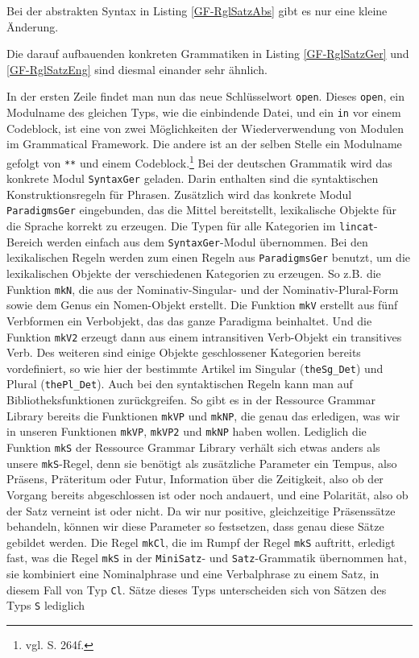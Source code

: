 
Bei der abstrakten Syntax in Listing \ref{GF-RglSatzAbs} gibt es nur eine kleine Änderung.

Die darauf aufbauenden konkreten Grammatiken in Listing \ref{GF-RglSatzGer} und \ref{GF-RglSatzEng} sind diesmal einander sehr ähnlich. \par
In der ersten Zeile findet man nun das neue Schlüsselwort \texttt{open}. Dieses \texttt{open}, ein Modulname des gleichen Typs, wie die einbindende Datei, und ein \texttt{in} vor einem Codeblock, ist eine von zwei Möglichkeiten der Wiederverwendung von Modulen im Grammatical Framework. Die andere ist an der selben Stelle ein Modulname gefolgt von \texttt{**} und einem Codeblock.\footnote{vgl. \cite{RANTA2011} S. 264f.} Bei der deutschen Grammatik wird das konkrete Modul \texttt{SyntaxGer} geladen. Darin enthalten sind die syntaktischen Konstruktionsregeln für Phrasen. Zusätzlich wird das konkrete Modul \texttt{ParadigmsGer} eingebunden, das die Mittel bereitstellt, lexikalische Objekte für die Sprache korrekt zu erzeugen. Die Typen für alle Kategorien im \texttt{lincat}-Bereich werden einfach aus dem \texttt{SyntaxGer}-Modul übernommen. Bei den lexikalischen Regeln werden zum einen Regeln aus \texttt{ParadigmsGer} benutzt, um die lexikalischen Objekte der verschiedenen Kategorien zu erzeugen. So z.B. die Funktion \texttt{mkN}, die aus der Nominativ-Singular- und der Nominativ-Plural-Form sowie dem Genus ein Nomen-Objekt erstellt. Die Funktion \texttt{mkV} erstellt aus fünf Verbformen ein Verbobjekt, das das ganze Paradigma beinhaltet. Und die Funktion \texttt{mkV2} erzeugt dann aus einem intransitiven Verb-Objekt ein transitives Verb. Des weiteren sind einige Objekte geschlossener Kategorien bereits vordefiniert, so wie hier der bestimmte Artikel im Singular (\texttt{theSg\_Det}) und Plural (\texttt{thePl\_Det}). Auch bei den syntaktischen Regeln kann man auf Bibliotheksfunktionen zurückgreifen. So gibt es in der Ressource Grammar Library bereits die Funktionen \texttt{mkVP} und \texttt{mkNP}, die genau das erledigen, was wir in unseren Funktionen \texttt{mkVP}, \texttt{mkVP2} und \texttt{mkNP} haben wollen. Lediglich die Funktion \texttt{mkS} der Ressource Grammar Library verhält sich etwas anders als unsere \texttt{mkS}-Regel, denn sie benötigt als zusätzliche Parameter ein Tempus, also Präsens, Präteritum oder Futur, Information über die Zeitigkeit, also ob der Vorgang bereits abgeschlossen ist oder noch andauert, und eine Polarität, also ob der Satz verneint ist oder nicht. Da wir nur positive, gleichzeitige Präsenssätze behandeln, können wir diese Parameter so festsetzen, dass genau diese Sätze gebildet werden. Die Regel \texttt{mkCl}, die im Rumpf der Regel \texttt{mkS} auftritt, erledigt fast, was die Regel \texttt{mkS} in der \texttt{MiniSatz}- und \texttt{Satz}-Grammatik übernommen hat, sie kombiniert eine Nominalphrase und eine Verbalphrase zu einem Satz, in diesem Fall von Typ \texttt{Cl}. Sätze dieses Typs unterscheiden sich von Sätzen des Typs \texttt{S} lediglich 